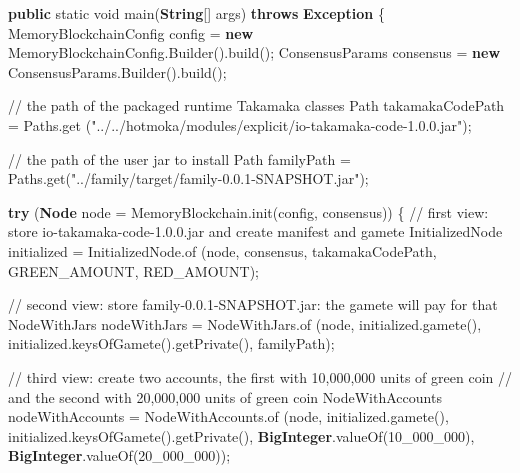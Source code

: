 \documentclass[a4paper,]{book}
\newenvironment{Shaded}{\begin{snugshade}}{\end{snugshade}}
\newcommand{\BuiltInTok}[1]{\textcolor[rgb]{0.39,0.29,0.61}{\textbf{#1}}}
\newcommand{\CommentTok}[1]{\textcolor[rgb]{0.54,0.53,0.53}{#1}}
\newcommand{\DataTypeTok}[1]{\textcolor[rgb]{0.00,0.34,0.68}{#1}}
\newcommand{\DecValTok}[1]{\textcolor[rgb]{0.69,0.50,0.00}{#1}}
\newcommand{\FunctionTok}[1]{\textcolor[rgb]{0.39,0.29,0.61}{#1}}
\newcommand{\KeywordTok}[1]{\textcolor[rgb]{0.12,0.11,0.11}{\textbf{#1}}}
\newcommand{\NormalTok}[1]{\textcolor[rgb]{0.12,0.11,0.11}{#1}}
\newcommand{\StringTok}[1]{\textcolor[rgb]{0.75,0.01,0.01}{#1}}
\renewenvironment{Shaded}{\begin{snugshade}\small}{\end{snugshade}}
\begin{document}
{\begin{Shaded}
\begin{Highlighting}[]
  \KeywordTok{public} \DataTypeTok{static} \DataTypeTok{void} \FunctionTok{main}\NormalTok{(}\BuiltInTok{String}\NormalTok{[] args) }\KeywordTok{throws} \BuiltInTok{Exception}\NormalTok{ \{}
\NormalTok{    MemoryBlockchainConfig config = }\KeywordTok{new}\NormalTok{ MemoryBlockchainConfig.}\FunctionTok{Builder}\NormalTok{().}\FunctionTok{build}\NormalTok{();}
\NormalTok{    ConsensusParams consensus = }\KeywordTok{new}\NormalTok{ ConsensusParams.}\FunctionTok{Builder}\NormalTok{().}\FunctionTok{build}\NormalTok{();}

    \CommentTok{// the path of the packaged runtime Takamaka classes}
\NormalTok{    Path takamakaCodePath = Paths.}\FunctionTok{get}
\NormalTok{      (}\StringTok{"../../hotmoka/modules/explicit/io-takamaka-code-1.0.0.jar"}\NormalTok{);}

    \CommentTok{// the path of the user jar to install}
\NormalTok{    Path familyPath = Paths.}\FunctionTok{get}\NormalTok{(}\StringTok{"../family/target/family-0.0.1-SNAPSHOT.jar"}\NormalTok{);}

    \KeywordTok{try}\NormalTok{ (}\BuiltInTok{Node}\NormalTok{ node = MemoryBlockchain.}\FunctionTok{init}\NormalTok{(config, consensus)) \{}
      \CommentTok{// first view: store io-takamaka-code-1.0.0.jar and create manifest and gamete}
\NormalTok{      InitializedNode initialized = InitializedNode.}\FunctionTok{of}
\NormalTok{        (node, consensus, takamakaCodePath, GREEN_AMOUNT, RED_AMOUNT);}

      \CommentTok{// second view: store family-0.0.1-SNAPSHOT.jar: the gamete will pay for that}
\NormalTok{      NodeWithJars nodeWithJars = NodeWithJars.}\FunctionTok{of}
\NormalTok{        (node, initialized.}\FunctionTok{gamete}\NormalTok{(), initialized.}\FunctionTok{keysOfGamete}\NormalTok{().}\FunctionTok{getPrivate}\NormalTok{(),}
\NormalTok{        familyPath);}

      \CommentTok{// third view: create two accounts, the first with 10,000,000 units of green coin}
      \CommentTok{// and the second with 20,000,000 units of green coin}
\NormalTok{      NodeWithAccounts nodeWithAccounts = NodeWithAccounts.}\FunctionTok{of}
\NormalTok{        (node, initialized.}\FunctionTok{gamete}\NormalTok{(), initialized.}\FunctionTok{keysOfGamete}\NormalTok{().}\FunctionTok{getPrivate}\NormalTok{(),}
        \BuiltInTok{BigInteger}\NormalTok{.}\FunctionTok{valueOf}\NormalTok{(}\DecValTok{10_000_000}\NormalTok{), }\BuiltInTok{BigInteger}\NormalTok{.}\FunctionTok{valueOf}\NormalTok{(}\DecValTok{20_000_000}\NormalTok{));}


\end{Highlighting}
\end{Shaded}}
\end{document}
